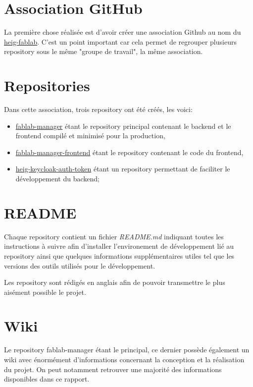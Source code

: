 \documentclass[
    iai, %
    il, %
]{heig-tb}
\begin{document}
\section{Association GitHub}
La première chose réalisée est d'avoir créer une association Github au nom du \href{https://github.com/heig-fablab}{heig-fablab}. C'est un point important car cela permet de regrouper plusieurs \Gls{repository} sous le même "groupe de travail", la même association.

\section{Repositories}
Dans cette association, trois \Gls{repository} ont été créés, les voici:
\begin{itemize}
    \item \href{https://github.com/heig-fablab/fablab-manager}{fablab-manager} étant le \Gls{repository} principal contenant le \Gls{backend} et le \Gls{frontend} compilé et minimisé pour la production,
    \item \href{https://github.com/heig-fablab/fablab-manager-frontend}{fablab-manager-frontend} étant le \Gls{repository} contenant le code du {frontend},
    \item \href{https://github.com/heig-fablab/heig-keycloak-auth-token}{heig-keycloak-auth-token} étant un \Gls{repository} permettant de faciliter le développement du \Gls{backend};
\end{itemize}

\section{README}
Chaque \Gls{repository} contient un fichier \emph{README.md} indiquant toutes les instructions à suivre afin d'installer l'environement de développement lié au \Gls{repository} ainsi que quelques informations supplémentaires utiles tel que les versions des outils utilisés pour le développement.

Les \Gls{repository} sont rédigés en anglais afin de pouvoir transmettre le plus aisément possible le projet.

\section{Wiki}
Le \Gls{repository} fablab-manager étant le principal, ce dernier possède également un wiki avec énormément d'informations concernant la conception et la réalisation du projet. On peut notamment retrouver une majorité des informations disponibles dans ce rapport.
\end{document}
